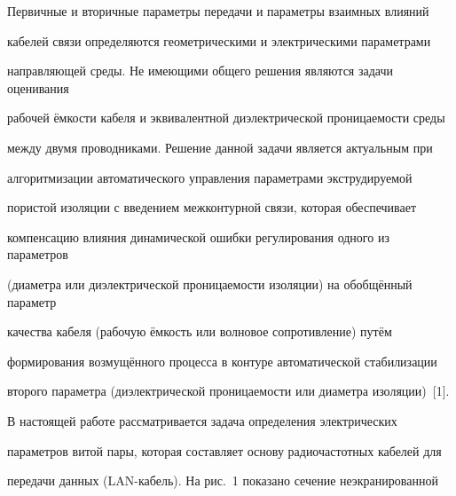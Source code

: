 \date{29.12.2007} 



\address{\samgtu}







\renewcommand{\baselinestretch}{.85}

\maketitle









Первичные и вторичные параметры передачи и параметры взаимных влияний 

кабелей связи определяются геометрическими и электрическими параметрами 

направляющей среды. Не имеющими общего решения являются задачи оценивания 

рабочей ёмкости кабеля и эквивалентной диэлектрической проницаемости среды 

между двумя проводниками. Решение данной задачи является актуальным при 

алгоритмизации автоматического управления параметрами экструдируемой 

пористой изоляции с введением межконтурной связи, которая обеспечивает 

компенсацию влияния динамической ошибки регулирования одного из параметров 

(диаметра или диэлектрической проницаемости изоляции) на обобщённый параметр 

качества кабеля (рабочую ёмкость или волновое сопротивление) путём 

формирования возмущённого процесса в контуре автоматической стабилизации 

второго параметра (диэлектрической проницаемости или диаметра изоляции)~[1].



В настоящей работе рассматривается задача определения электрических 

параметров витой пары, которая составляет основу радиочастотных кабелей для 

передачи данных (LAN-кабель). На рис.~1 показано сечение неэкранированной 


